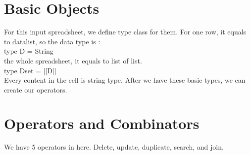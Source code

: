 \documentclass[11pt]{article}
\begin{document}
\section{Basic Objects}

For this input spreadsheet, we define type class for them. For one row, it equals to datalist, so the data type is :\\ type D = String \\
the whole spreadsheet, it equals to list of list. \\
type Dset = [[D]]\\
Every content in the cell is string type. After we have these basic types, we can create our operators.

\section{Operators and Combinators}
\label{sec:comb}
We have 5 operators in here. Delete, update, duplicate, search, and join. 
\end{document}
